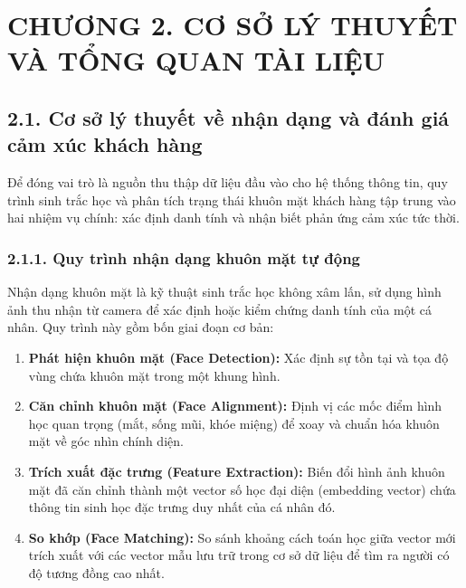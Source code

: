 \section*{CHƯƠNG 2. CƠ SỞ LÝ THUYẾT VÀ TỔNG QUAN TÀI LIỆU}
\setcounter{section}{2}
\setcounter{subsection}{0}
\setcounter{figure}{0}
\setcounter{table}{0}

\subsection*{2.1. Cơ sở lý thuyết về nhận dạng và đánh giá cảm xúc khách hàng}

Để đóng vai trò là nguồn thu thập dữ liệu đầu vào cho hệ thống thông tin, quy trình sinh trắc học và phân tích trạng thái khuôn mặt khách hàng tập trung vào hai nhiệm vụ chính: xác định danh tính và nhận biết phản ứng cảm xúc tức thời.

\subsubsection*{2.1.1. Quy trình nhận dạng khuôn mặt tự động}

Nhận dạng khuôn mặt là kỹ thuật sinh trắc học không xâm lấn, sử dụng hình ảnh thu nhận từ camera để xác định hoặc kiểm chứng danh tính của một cá nhân. Quy trình này gồm bốn giai đoạn cơ bản:
\begin{enumerate}
    \item \textbf{Phát hiện khuôn mặt (Face Detection):} Xác định sự tồn tại và tọa độ vùng chứa khuôn mặt trong một khung hình.
    \item \textbf{Căn chỉnh khuôn mặt (Face Alignment):} Định vị các mốc điểm hình học quan trọng (mắt, sống mũi, khóe miệng) để xoay và chuẩn hóa khuôn mặt về góc nhìn chính diện.
    \item \textbf{Trích xuất đặc trưng (Feature Extraction):} Biến đổi hình ảnh khuôn mặt đã căn chỉnh thành một vector số học đại diện (embedding vector) chứa thông tin sinh học đặc trưng duy nhất của cá nhân đó.
    \item \textbf{So khớp (Face Matching):} So sánh khoảng cách toán học giữa vector mới trích xuất với các vector mẫu lưu trữ trong cơ sở dữ liệu để tìm ra người có độ tương đồng cao nhất.
\end{enumerate}

